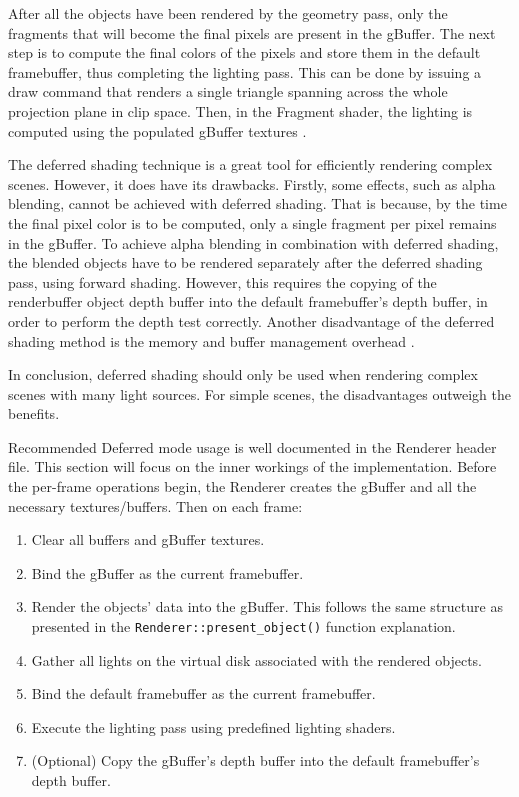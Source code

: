\documentclass[
  digital,     %
  oneside,     %
  nosansbold,  %
  nocolorbold, %
  lof,         %
  lot,         %
]{fithesis4}
\begin{document}
After all the objects have been rendered by the geometry pass, only the fragments that will become
the final pixels are present in the gBuffer. The next step is to compute the final colors of the pixels
and store them in the default framebuffer, thus completing the lighting pass.
This can be done by issuing a draw command that renders a single triangle
spanning across the whole projection plane in clip space. Then, in the Fragment shader, the lighting is computed
using the populated gBuffer textures \cite{learnopengl-deferred}.

The deferred shading technique is a great tool for efficiently rendering complex scenes. However, it does have its drawbacks.
Firstly, some effects, such as alpha blending, cannot be achieved with deferred shading. That is because, by the time
the final pixel color is to be computed, only a single fragment per pixel remains in the gBuffer. To achieve
alpha blending in combination with deferred shading, the blended objects have to be rendered separately after
the deferred shading pass, using forward shading. However, this requires the copying of the renderbuffer object depth
buffer into the default framebuffer's depth buffer, in order to perform the depth test correctly. Another
disadvantage of the deferred shading method is the memory and buffer management overhead \cite{learnopengl-deferred}.

In conclusion, deferred shading should only be used when rendering complex scenes with many light sources.
For simple scenes, the disadvantages outweigh the benefits.

Recommended Deferred mode usage is well documented in the Renderer header file. This section will focus on the inner workings
of the implementation. Before the per-frame operations begin,
the Renderer creates the gBuffer and all the necessary textures/buffers. Then on each frame:
\begin{enumerate}
    \item Clear all buffers and gBuffer textures.
    
    \item Bind the gBuffer as the current framebuffer.
    
    \item Render the objects' data into the gBuffer. This follows the same structure as presented in the
    \verb|Renderer::present_object()| function explanation.

    \item Gather all lights on the virtual disk associated with the rendered objects.

    \item Bind the default framebuffer as the current framebuffer.

    \item Execute the lighting pass using predefined lighting shaders.

    \item (Optional) Copy the gBuffer's depth buffer into the default framebuffer's depth buffer.
\end{enumerate}
\end{document}

